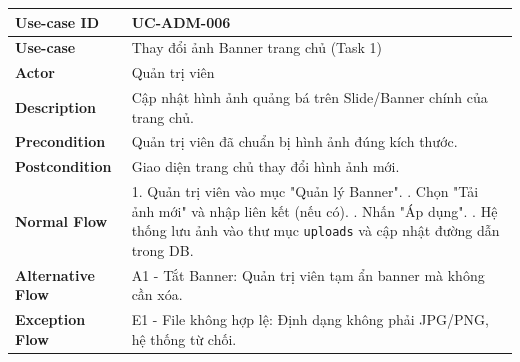 \begin{table}[H]
\centering
\renewcommand{\arraystretch}{1.2}
\begin{tabular}{|p{3.5cm}|p{9.5cm}|}
\hline
\textbf{Use-case ID} & UC-ADM-006 \\ \hline
\textbf{Use-case} & Thay đổi ảnh Banner trang chủ (Task 1) \\ \hline
\textbf{Actor} & Quản trị viên \\ \hline
\textbf{Description} & Cập nhật hình ảnh quảng bá trên Slide/Banner chính của trang chủ. \\ \hline
\textbf{Precondition} & Quản trị viên đã chuẩn bị hình ảnh đúng kích thước. \\ \hline
\textbf{Postcondition} & Giao diện trang chủ thay đổi hình ảnh mới. \\ \hline
\textbf{Normal Flow} & 
1. Quản trị viên vào mục "Quản lý Banner". \newline
2. Chọn "Tải ảnh mới" và nhập liên kết (nếu có). \newline
3. Nhấn "Áp dụng". \newline
4. Hệ thống lưu ảnh vào thư mục \texttt{uploads} và cập nhật đường dẫn trong DB. \\ \hline
\textbf{Alternative Flow} & A1 - Tắt Banner: Quản trị viên tạm ẩn banner mà không cần xóa. \\ \hline
\textbf{Exception Flow} & E1 - File không hợp lệ: Định dạng không phải JPG/PNG, hệ thống từ chối. \\ \hline
\end{tabular}
\end{table}